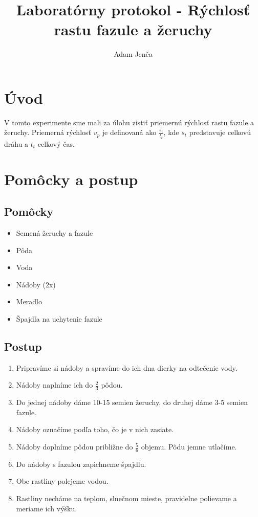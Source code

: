\documentclass{article}
\begin{document}
\title {\textbf{Laboratórny protokol - Rýchlosť rastu fazule a žeruchy}}
\author{Adam Jenča}
\setlength{\tabcolsep}{18pt}
\renewcommand{\arraystretch}{1.5}
\maketitle
\section{Úvod}
V tomto experimente sme mali za úlohu zistiť priemernú rýchlosť rastu fazule a žeruchy.
Priemerná rýchlosť $v_p$ je definovaná ako $\frac{s_t}{t_t}$, kde $s_t$ predstavuje celkovú dráhu a $t_t$ celkový čas.
\section{Pomôcky a postup}
\subsection{Pomôcky}
\begin{itemize}
\item{Semená žeruchy a fazule}
\item{Pôda}
\item{Voda}
\item{Nádoby (2x)}
\item{Meradlo}
\item{Špajdľa na uchytenie fazule}
\end{itemize}
\subsection{Postup}
\begin{enumerate}
	\item Pripravíme si nádoby a spravíme do ich dna dierky na odtečenie vody.
	\item Nádoby naplníme ich do $\frac{2}{3}$ pôdou.
        \item Do jednej nádoby dáme 10-15 semien žeruchy, do druhej dáme 3-5 semien fazule.
	\item Nádoby označíme podľa toho, čo je v nich zasiate.
	\item Nádoby doplníme pôdou približne do $\frac{5}{6}$ objemu. Pôdu jemne utlačíme.
        \item Do nádoby s fazuľou zapichneme špajdľu.
        \item Obe rastliny polejeme vodou.
        \item Rastliny necháme na teplom, slnečnom mieste, pravidelne polievame a meriame ich výšku.
\end{enumerate}
\end{document}
